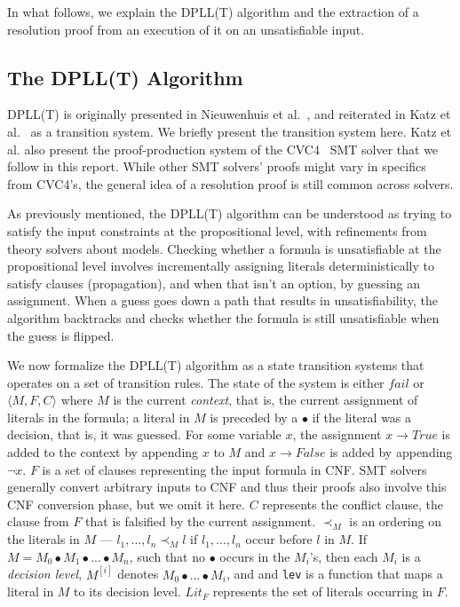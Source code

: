 \documentclass{article}
\begin{document}
	In what follows, we explain the 
	DPLL(T) algorithm and the 
	extraction of a resolution proof
	from an execution of it on an 
	unsatisfiable input.
	
	\subsection{The DPLL(T) Algorithm}
	\label{sec:dpllt}
	
	DPLL(T) is originally presented 
	in Nieuwenhuis et al.~\cite{DBLP:journals/jacm/NieuwenhuisOT06}, 
	and reiterated in Katz et 
	al.~\cite{DBLP:conf/fmcad/KatzBTRH16} 
	as a transition system. We briefly present 
	the transition system here. Katz et al. also 
	present the proof-production system of the 
	CVC4~\cite{DBLP:conf/cav/BarrettCDHJKRT11} 
	SMT solver that we follow 
	in this report. While other SMT solvers'
	proofs might vary in specifics from 
	CVC4's, the general idea of a 
	resolution proof is still common 
	across solvers.
	
	As previously mentioned, the DPLL(T)
	algorithm can be understood as 
	trying to satisfy the input constraints
	at the propositional level, with 
	refinements from theory solvers
	about models. Checking whether a
	formula is unsatisfiable at the 
	propositional level involves 
	incrementally assigning literals
	deterministically to satisfy clauses
	(propagation), and when that isn't an 
	option, by guessing an 
	assignment. When a guess goes 
	down a path that results in 
	unsatisfiability, the algorithm 
	backtracks and checks whether the 
	formula is still unsatisfiable 
	when the guess is flipped.
	
	We now formalize the DPLL(T) algorithm 
	as a state transition systems that 
	operates on a set of transition rules. 
	The state of the system is either 
	$fail$ or $\langle M, F, C \rangle$ 
	where $M$ is the current 
	\textit{context}, that is, 
	the current assignment of literals in 
	the formula; a literal in $M$ is 
	preceded by a $\bullet$ if the literal 
	was a decision, that is, it was 
	guessed. For some variable $x$, 
	the assignment $x \to True$ is added 
	to the context by appending $x$ to 
	$M$ and $x \to False$ is added by 
	appending $\neg x$. $F$ is a set of 
	clauses representing the input formula 
	in CNF. SMT solvers generally convert 
	arbitrary inputs to CNF and thus 
	their proofs also involve this CNF
	conversion phase, but we omit it here.
	$C$ represents the conflict 
	clause, the clause from $F$ that is 
	falsified by the current assignment. 
	$\prec_M$ is an ordering 
	on the literals in $M$ ---
	$l_1, ..., l_n \prec_M l$ if 
	$l_1, ..., l_n$ occur before 
	$l$ in $M$. If $M = M_0 
	\bullet M_1 \bullet ... \bullet M_n$, 
	such that no $\bullet$ occurs in 
	the $M_i$'s, then each $M_i$ is a
	\textit{decision level}, $M^{[i]}$ 
	denotes $M_0 \bullet ... \bullet M_i$,
	and and \texttt{lev} is a function 
	that maps a literal in $M$ to its 
	decision level. $Lit_F$ represents the 
	set of literals occurring in $F$.
	
\end{document}
